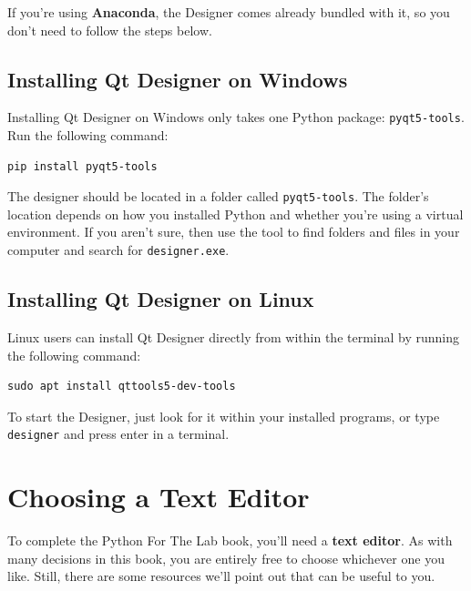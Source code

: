 If you're using \textbf{Anaconda}, the Designer comes already bundled with it, so you don't need to follow the steps below.

\subsection{Installing Qt Designer on Windows}\label{subsec:installing-on-windows}
Installing Qt Designer on Windows only takes one Python package: \texttt{pyqt5-tools}. Run the following command:

\begin{verbatim}
pip install pyqt5-tools
\end{verbatim}

\sloppy The designer should be located in a folder called \texttt{pyqt5-tools}. The folder's location depends on how you installed Python and whether you're using a virtual environment. If you aren't sure, then use the tool to find folders and files in your computer and search for \texttt{designer.exe}.


\subsection{Installing Qt Designer on Linux}\label{subsec:installing-on-linux}
Linux users can install Qt Designer directly from within the terminal by running the following command:

\begin{verbatim}
sudo apt install qttools5-dev-tools
\end{verbatim}

To start the Designer, just look for it within your installed programs, or type \texttt{designer} and press enter in a terminal.

\section{Choosing a Text Editor}\label{sec:editors}
To complete the Python For The Lab book, you'll need a \textbf{text editor}. As with many decisions in this book, you are entirely free to choose whichever one you like. Still, there are some resources we'll point out that can be useful to you.

